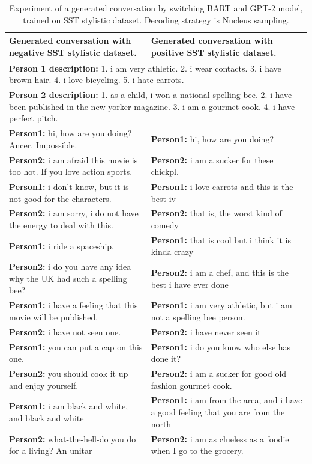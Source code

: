 \begin{table}[H]
\centering
 \begin{tabular}{|p{7cm}|p{7cm}|} 
 \hline
 \textbf{Generated conversation with negative SST stylistic dataset.} & \textbf{Generated conversation with positive SST stylistic dataset.}\\
 \hline
 \multicolumn{2}{|p{14cm}|}{\textbf{Person 1 description:} 1. i am very athletic. 2. i wear contacts. 3. i have brown hair. 4. i love bicycling. 5. i hate carrots.} \\
 \hline
 \multicolumn{2}{|p{14cm}|}{\textbf{Person 2 description:} 1. as a child, i won a national spelling bee. 2. i have been published in the new yorker magazine. 3. i am a gourmet cook. 4. i have perfect pitch.} \\
 \hline
 \textbf{Person1:} hi, how are you doing? Ancer. Impossible.& \textbf{Person1:} hi, how are you doing? \\
 \textbf{Person2:} i am afraid this movie is too hot. If you love action sports. &  \textbf{Person2:} i am a sucker for these chickpl. \\ 
 \textbf{Person1:} i don't know, but it is not good for the characters. & \textbf{Person1:} i love carrots and this is the best iv \\
 \textbf{Person2:} i am sorry, i do not have the energy to deal with this. & \textbf{Person2:} that is, the worst kind of comedy  \\
 \textbf{Person1:} i ride a spaceship. & \textbf{Person1:} that is cool but i think it is kinda crazy \\
 \textbf{Person2:} i do you have any idea why the UK had such a spelling bee?  & \textbf{Person2:} i am a chef, and this is the best i have ever done \\
 \textbf{Person1:} i have a feeling that this movie will be published. & \textbf{Person1:} i am very athletic, but i am not a spelling bee person. \\
 \textbf{Person2:} i have not seen one\/.  & \textbf{Person2:} i have never seen it  \\
 \textbf{Person1:} you can put a cap on this one. & \textbf{Person1:} i do you know who else has done it? \\
 \textbf{Person2:} you should cook it up and enjoy yourself. & \textbf{Person2:} i am a sucker for good old fashion gourmet cook. \\
 \textbf{Person1:} i am black and white, and black and white & \textbf{Person1:} i am from the area, and i have a good feeling that you are from the north \\
 \textbf{Person2:} what-the-hell-do you do for a living? An unitar & \textbf{Person2:} i am as clueless as a foodie when I go to the grocery. \\
 \hline
 \end{tabular}
 \caption{Experiment of a generated conversation by switching BART and GPT-2 model, trained on SST stylistic dataset. Decoding strategy is Nucleus sampling.}
\label{tab:sst_switch_nucleus}
\end{table}

